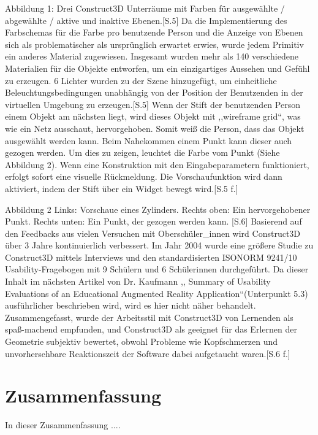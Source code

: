 \documentclass[deutsch]{llncs}
\begin{document}
Abbildung 1: Drei Construct3D Unterräume mit Farben für ausgewählte / abgewählte / aktive und inaktive Ebenen.[S.5]
Da die Implementierung des Farbschemas für die Farbe pro benutzende Person und die Anzeige von Ebenen sich als problematischer als ursprünglich erwartet erwies, wurde jedem Primitiv ein anderes Material zugewiesen. Insgesamt wurden mehr als 140 verschiedene Materialien für die Objekte entworfen, um ein einzigartiges Aussehen und Gefühl zu erzeugen. 6 Lichter wurden zu der Szene hinzugefügt, um einheitliche Beleuchtungsbedingungen unabhängig von der Position der Benutzenden in der virtuellen Umgebung zu erzeugen.[S.5]
Wenn der Stift der benutzenden Person einem Objekt am nächsten liegt, wird dieses Objekt mit ,,wireframe grid“, was wie ein Netz ausschaut, hervorgehoben. Somit weiß die Person, dass das Objekt ausgewählt werden kann. Beim Nahekommen einem Punkt kann dieser auch gezogen werden. Um dies zu zeigen, leuchtet die Farbe vom Punkt (Siehe Abbildung 2). Wenn eine Konstruktion mit den Eingabeparametern funktioniert, erfolgt sofort eine visuelle Rückmeldung. Die Vorschaufunktion wird dann aktiviert, indem der Stift über ein Widget bewegt wird.[S.5 f.]
 
Abbildung 2 Links: Vorschaue eines Zylinders. Rechts oben: Ein hervorgehobener Punkt.
Rechts unten: Ein Punkt, der gezogen werden kann. [S.6]
Basierend auf den Feedbacks aus vielen Versuchen mit Oberschüler\_innen wird Construct3D über 3 Jahre kontinuierlich verbessert. Im Jahr 2004 wurde eine größere Studie zu Construct3D mittels Interviews und den standardisierten ISONORM 9241/10 Usability-Fragebogen mit 9 Schülern und 6 Schülerinnen durchgeführt. Da dieser Inhalt im nächsten Artikel von Dr. Kaufmann ,, Summary of Usability Evaluations of an Educational Augmented Reality Application“(Unterpunkt 5.3) ausführlicher beschrieben wird, wird es hier nicht näher behandelt. Zusammengefasst, wurde der Arbeitsstil mit Construct3D von Lernenden als spaß-machend empfunden, und Construct3D als geeignet für das Erlernen der Geometrie subjektiv bewertet, obwohl Probleme wie Kopfschmerzen und unvorhersehbare Reaktionszeit der Software dabei aufgetaucht waren.[S.6 f.]









\section{Zusammenfassung}
\label{sec:typo}
In dieser Zusammenfassung .... 
\end{document}
